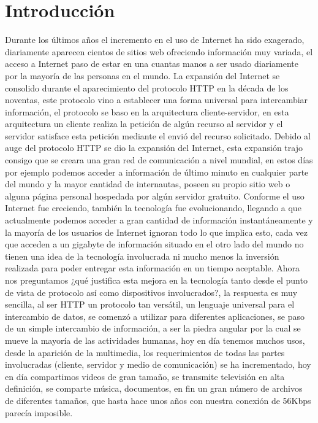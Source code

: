 
\chapter{Introducción} %

\label{ch:introduction} %


Durante los últimos años el incremento en el uso de Internet ha sido exagerado, diariamente aparecen cientos de sitios web ofreciendo información muy variada, el acceso a Internet paso de estar en una cuantas manos a ser usado diariamente por la mayoría de las personas en el mundo. La expansión del Internet se consolido durante el aparecimiento del protocolo HTTP en la década de los noventas, este protocolo vino a establecer una forma universal para intercambiar información, el protocolo se baso en la arquitectura cliente-servidor, en esta arquitectura un cliente realiza la petición de algún recurso al servidor y el servidor satisface esta petición mediante el envió del recurso solicitado.
Debido al auge del protocolo HTTP se dio la expansión del Internet, esta expansión trajo consigo que se creara una gran red de comunicación a nivel mundial, en estos días por ejemplo podemos acceder a información de último minuto en cualquier parte del mundo y la mayor cantidad de internautas, poseen su propio sitio web o alguna página personal hospedada por algún servidor gratuito. Conforme el uso Internet fue creciendo, también la tecnología fue evolucionando, llegando a que actualmente podemos acceder a gran cantidad de información instantáneamente y la mayoría de los usuarios de Internet ignoran todo lo que implica esto, cada vez que acceden a un gigabyte de información situado en el otro lado del mundo no tienen una idea de la tecnología involucrada ni mucho menos la inversión realizada para poder entregar esta información en un tiempo aceptable.
Ahora nos preguntamos ¿qué justifica esta mejora en la tecnología tanto desde el punto de vista de protocolo así como dispositivos involucrados?, la respuesta es muy sencilla, al ser HTTP un protocolo tan versátil, un lenguaje universal para el intercambio de datos, se comenzó a utilizar para diferentes aplicaciones, se paso de un simple intercambio de información, a ser la piedra angular por la cual se mueve la mayoría de las actividades humanas, hoy en día tenemos muchos usos, desde la aparición de la multimedia, los requerimientos de todas las partes involucradas (cliente, servidor y medio de comunicación) se ha incrementado, hoy en día compartimos videos de gran tamaño, se transmite televisión en alta definición, se comparte música, documentos, en fin un gran número de archivos de diferentes tamaños, que hasta hace unos años con nuestra conexión de 56Kbps parecía imposible.
